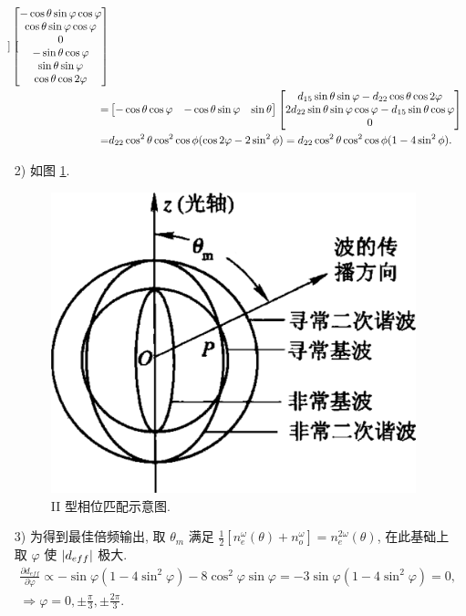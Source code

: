 \documentclass{assignment}
\begin{document}
\begin{sol}
\begin{itemize}
\begin{align}
\begin{bmatrix}
            \end{bmatrix}\begin{bmatrix}
                -\cos\theta\sin\varphi\cos\varphi\\
                \cos\theta\sin\varphi\cos\varphi\\
                0\\
                -\sin\theta\cos\varphi\\
                \sin\theta\sin\varphi\\
                \cos\theta\cos 2\varphi
            \end{bmatrix}\\
            \notag=&\begin{bmatrix}
                -\cos\theta\cos\varphi&-\cos\theta\sin\varphi&\sin\theta
            \end{bmatrix}\begin{bmatrix}
                d_{15}\sin\theta\sin\varphi-d_{22}\cos\theta\cos 2\varphi\\
                2d_{22}\sin\theta\sin\varphi\cos\varphi-d_{15}\sin\theta\cos\varphi\\
                0
            \end{bmatrix}\\
            =&d_{22}\cos^2\theta\cos^2\cos\phi(\cos 2\varphi-2\sin^2\phi)=d_{22}\cos^2\theta\cos^2\cos\phi(1-4\sin^2\phi).
        \end{align}
        \item[2)] 如图 \ref{A1-3}.
        \begin{figure}[H]
            \centering
            \includegraphics[width=.5\columnwidth]{Figures/A1-3.png}
            \caption{II 型相位匹配示意图.}
            \label{A1-3}
        \end{figure}
        \item[3)] 为得到最佳倍频输出, 取 $\theta_m$ 满足 $\frac{1}{2}[n_e^{\omega}(\theta)+n_o^{\omega}]=n_e^{2\omega}(\theta)$, 在此基础上取 $\varphi$ 使 $\left\lvert d_{eff}\right\rvert$ 极大.
        \begin{gather}
            \frac{\partial d_{eff}}{\partial\varphi}\propto-\sin\varphi(1-4\sin^2\varphi)-8\cos^2\varphi\sin\varphi=-3\sin\varphi(1-4\sin^2\varphi)=0,\\
            \Longrightarrow\varphi=0,\pm\frac{\pi}{3},\pm\frac{2\pi}{3}.
        \end{gather}
    \end{itemize}
\end{sol}
\end{document}
